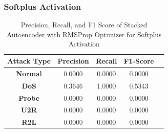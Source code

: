 \documentclass[12pt, a4paper]{report}
\begin{document}
\subsubsection{Softplus Activation}
\begin{table}[ht]
\centering
\captionsetup{justification=centering,margin=2cm}
\begin{tabular}{|c|c|c|c|c|}
\hline
\multicolumn{1}{|c|}{\textbf{Attack Type}} & \multicolumn{1}{c|}{\textbf{Precision}} & \multicolumn{1}{c|}{\textbf{Recall}} & \multicolumn{1}{c|}{\textbf{F1-Score}} \\ \hline
\textbf{Normal}        & 0.0000                                   & 0.0000                                & 0.0000                                                                  \\ \hline
\textbf{DoS}           & 0.3646                                  & 1.0000                                &  0.5343                                                                    \\ \hline
\textbf{Probe}         & 0.0000                                  & 0.0000                                & 0.0000                                                                  \\ \hline
\textbf{U2R}           & 0.0000                                    & 0.0000                                & 0.0000                                                                   \\ \hline
\textbf{R2L}           & 0.0000                                      & 0.0000                                   & 0.0000                                                            \\ \hline         \end{tabular}
\caption{Precision, Recall, and F1 Score of Stacked Autoencoder with RMSProp Optimizer for Softplus Activation}
\label{prf1_rmsprop_elu_auto}
\end{table}
\end{document}
